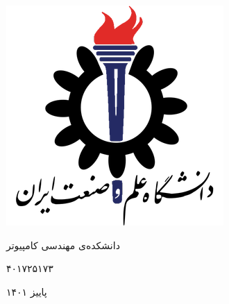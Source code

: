 \begin{titlepage}
    \centering
    \includegraphics[width=0.4\columnwidth]{Images/IUSTLogo.png}
    
    \vspace{1.5 cm}
    
    \LARGE{دانشکده‌ی مهندسی کامپیوتر}
    
    \vspace{1 cm}
    
    \large \Course
    
    \vspace{0.5 cm}
    
    \large \Subject
    
    \vspace{1 cm}

    \large \Name
    
    \vspace{0.5 cm}
    
    \large{۴۰۱۷۲۵۱۷۳}
    
    \vspace{1 cm}
    
    پاییز ۱۴۰۱

\end{titlepage}